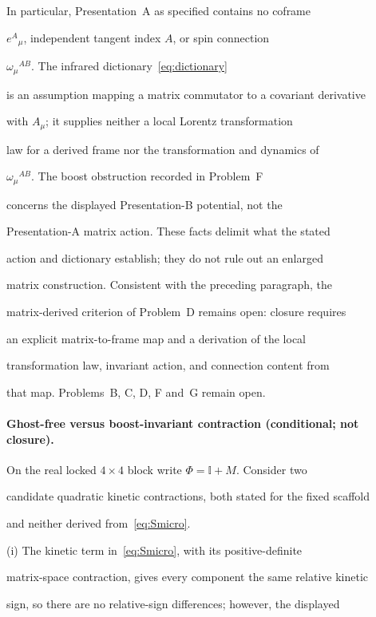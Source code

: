 In particular, Presentation~A as specified contains no coframe

\(e^A{}_\mu\), independent tangent index \(A\), or spin connection

\(\omega_\mu{}^{AB}\). The infrared dictionary~\eqref{eq:dictionary}

is an assumption mapping a matrix commutator to a covariant derivative

with \(A_\mu\); it supplies neither a local Lorentz transformation

law for a derived frame nor the transformation and dynamics of

\(\omega_\mu{}^{AB}\). The boost obstruction recorded in Problem~F

concerns the displayed Presentation-B potential, not the

Presentation-A matrix action. These facts delimit what the stated

action and dictionary establish; they do not rule out an enlarged

matrix construction. Consistent with the preceding paragraph, the

matrix-derived criterion of Problem~D remains open: closure requires

an explicit matrix-to-frame map and a derivation of the local

transformation law, invariant action, and connection content from

that map. Problems~B, C, D, F and~G remain open.





\paragraph{Ghost-free versus boost-invariant contraction (conditional; not closure).} \label{detail:sec-C-paragraphghostfreeversusboosti-14}

On the real locked \(4\times4\) block write \(\Phi=\mathbb{I}+M\). Consider two

candidate quadratic kinetic contractions, both stated for the fixed scaffold

and neither derived from~\eqref{eq:Smicro}.

(i) The kinetic term in~\eqref{eq:Smicro}, with its positive-definite

matrix-space contraction, gives every component the same relative kinetic

sign, so there are no relative-sign differences; however, the displayed


